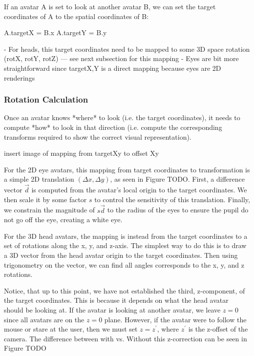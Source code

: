 If an avatar A is set to look at another avatar B, we can set the target coordinates of A to the spatial coordinates of B:


A.targetX = B.x
A.targetY = B.y



- For heads, this target coordinates need to be mapped to some 3D space rotation (rotX, rotY, rotZ) --- see next subsection for this mapping
- Eyes are bit more straightforward since targetX,Y is a direct mapping because eyes are 2D renderings

\subsubsection{Rotation Calculation}

Once an avatar knows *where* to look (i.e. the target coordinates), it needs to compute *how* to look in that direction (i.e. compute the corresponding transforms required to show the correct visual representation).

insert image of mapping from targetXy to offset Xy

For the 2D eye avatars, this mapping from target coordinates to transformation is a simple 2D translation $(\Delta x, \Delta y)$, as seen in Figure TODO. First, a difference vector $\vec d$ is computed from the avatar’s local origin to the target coordinates. We then scale it by some factor $s$ to control the sensitivity of this translation. Finally, we constrain the magnitude of $s\vec d$ to the radius of the eyes to ensure the pupil do not go off the eye, creating a white eye.

For the 3D head avatars, the mapping is instead from the target coordinates to a set of rotations along the x, y, and z-axis. The simplest way to do this is to draw a 3D vector from the head avatar origin to the target coordinates. Then using trigonometry on the vector, we can find all angles corresponds to the x, y, and z rotations.

Notice, that up to this point, we have not established the third, z-component, of the target coordinates. This is because it depends on what the head avatar should be looking at. If the avatar is looking at another avatar, we leave $z = 0$ since all avatars are on the $z = 0$ plane. However, if the avatar were to follow the mouse or stare at the user, then we must set $z = z^\prime$, where $z^\prime$ is the z-offset of the camera. The difference between with vs. Without this z-correction can be seen in Figure TODO


